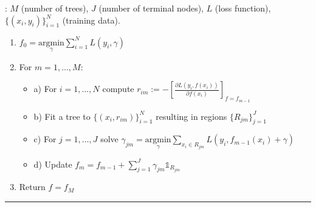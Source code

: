 \documentclass[letterpaper,10pt,english]{sphinxmanual}
\begin{document}
: \(M\) (number of trees), \(J\) (number of terminal nodes), \(L\) (loss function), \(\{(x_i, y_i)\}_{i=1}^N\) (training data).
\begin{enumerate}
%
\item {} 
\(f_0 = \underset{\gamma}{\text{argmin}} \sum_{i=1}^N L(y_i, \gamma)\)

\item {} 
For \(m = 1, \dots, M\):
\begin{itemize}
\item {} 
a) For \(i=1,\dots,N\) compute \(r_{im} := - \left[\frac{\partial L(y_i, f(x_i))}{\partial f(x_i)}  \right]_{f = f_{m-1}}\)

\item {} 
b) Fit a tree to \(\{(x_i, r_{im})\}_{i=1}^N\) resulting in regions \(\{R_{jm}\}_{j=1}^J\)

\item {} 
c) For \(j=1,\dots,J\) solve \(\gamma_{jm} = \underset{\gamma}{\text{argmin}} \sum_{x_i \in R_{jm}} L(y_i, f_{m-1}(x_i) + \gamma)\)

\item {} 
d) Update \(f_m = f_{m-1} + \sum_{j=1}^J \gamma_{jm} \mathbb{1}_{R_{jm}}\)

\end{itemize}

\item {} 
Return \(f = f_M\)

\end{enumerate}


\bigskip\hrule\bigskip


\end{document}
